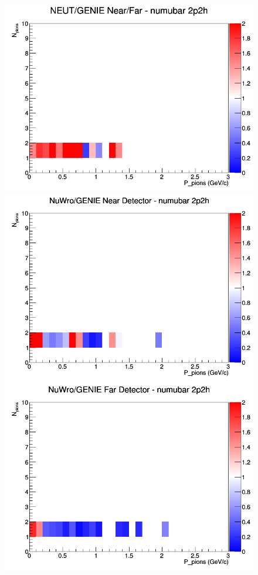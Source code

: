 \documentclass[12pt]{article}
\begin{document}
\begin{figure}[h]
\endminipage
{}
\includegraphics[width=\linewidth]{N_P/nominal/pions/ratios/2p2h_NEUT_GENIE_numubar_NF_N_P.png}
\endminipage
\newline
{}
\includegraphics[width=\linewidth]{N_P/nominal/pions/ratios/2p2h_NuWro_GENIE_numubar_near_N_P.png}
\endminipage
{}
\includegraphics[width=\linewidth]{N_P/nominal/pions/ratios/2p2h_NuWro_GENIE_numubar_far_N_P.png}

\end{figure}
\end{document}
